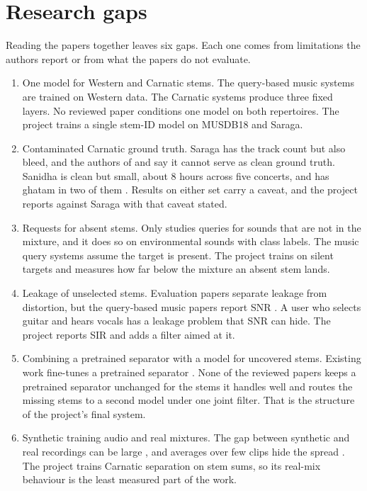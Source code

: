 \documentclass[12pt,a4paper]{article}
\begin{document}
\section{Research gaps}

Reading the papers together leaves six gaps. Each one comes from limitations the authors report or from what the papers do not evaluate.

\begin{enumerate}[leftmargin=2.2em,itemsep=0.5em]
\item One model for Western and Carnatic stems. The query-based music systems \cite{banquet,hyperell,qscnet} are trained on Western data. The Carnatic systems \cite{carnaticft,ssn} produce three fixed layers. No reviewed paper conditions one model on both repertoires. The project trains a single stem-ID model on MUSDB18 and Saraga.
\item Contaminated Carnatic ground truth. Saraga has the track count but also bleed, and the authors of \cite{sanidha} and \cite{carnaticft} say it cannot serve as clean ground truth. Sanidha is clean but small, about 8 hours across five concerts, and has ghatam in two of them \cite{sanidha}. Results on either set carry a caveat, and the project reports against Saraga with that caveat stated.
\item Requests for absent stems. Only \cite{pmq} studies queries for sounds that are not in the mixture, and it does so on environmental sounds with class labels. The music query systems \cite{banquet,hyperell,qscnet} assume the target is present. The project trains on silent targets and measures how far below the mixture an absent stem lands.
\item Leakage of unselected stems. Evaluation papers \cite{mapss,perceptual} separate leakage from distortion, but the query-based music papers report SNR \cite{banquet}. A user who selects guitar and hears vocals has a leakage problem that SNR can hide. The project reports SIR and adds a filter aimed at it.
\item Combining a pretrained separator with a model for uncovered stems. Existing work fine-tunes a pretrained separator \cite{sjtu,carnaticft}. None of the reviewed papers keeps a pretrained separator unchanged for the stems it handles well and routes the missing stems to a second model under one joint filter. That is the structure of the project's final system.
\item Synthetic training audio and real mixtures. The gap between synthetic and real recordings can be large \cite{ensembles}, and averages over few clips hide the spread \cite{perceptual}. The project trains Carnatic separation on stem sums, so its real-mix behaviour is the least measured part of the work.
\end{enumerate}
\end{document}
